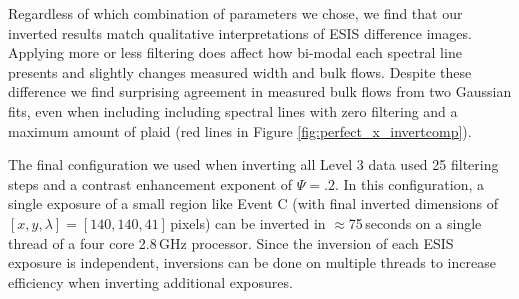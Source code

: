 	Regardless of which combination of parameters we chose, we find that our inverted results match qualitative interpretations of ESIS difference images.
	Applying more or less filtering does affect how bi-modal each spectral line presents and slightly changes measured width and bulk flows.
	Despite these difference we find surprising agreement in measured bulk flows from two Gaussian fits, even when including including spectral lines with zero filtering and a maximum amount of plaid (red lines in Figure \ref{fig:perfect_x_invertcomp}).
	
	The final configuration we used when inverting all Level 3 data used 25 filtering steps and a contrast enhancement exponent of $\Psi=.2$.
	In this configuration, a single exposure of a small region like Event C (with final inverted dimensions of $[x,y,\lambda] = [140,140,41]$\,pixels) can be inverted in $\approx$75\,seconds on a single thread of a four core 2.8\,GHz processor.
	Since the inversion of each ESIS exposure is independent, inversions can be done on multiple threads to increase efficiency when inverting additional exposures.
	
	
	
	  

